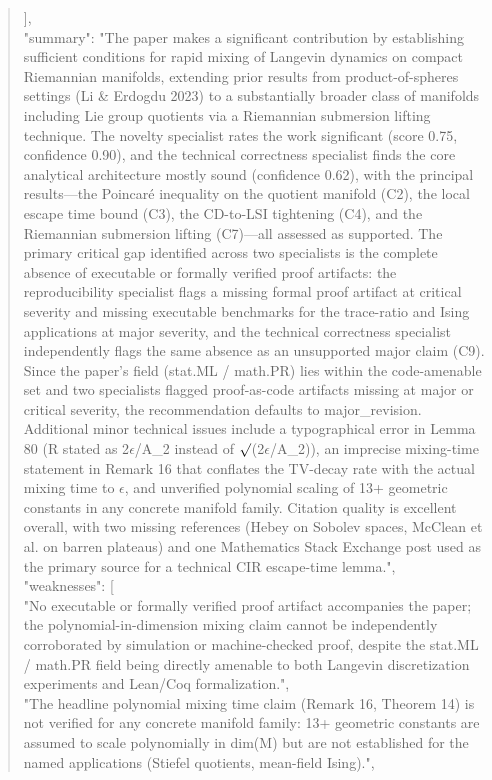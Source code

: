 \documentclass[11pt]{article}
\begin{document}
\begin{quote}
  ],\\
  "summary": "The paper makes a significant contribution by establishing sufficient conditions for rapid mixing of Langevin dynamics on compact Riemannian manifolds, extending prior results from product-of-spheres settings (Li \& Erdogdu 2023) to a substantially broader class of manifolds including Lie group quotients via a Riemannian submersion lifting technique. The novelty specialist rates the work significant (score 0.75, confidence 0.90), and the technical correctness specialist finds the core analytical architecture mostly sound (confidence 0.62), with the principal results---the Poincaré inequality on the quotient manifold (C2), the local escape time bound (C3), the CD-to-LSI tightening (C4), and the Riemannian submersion lifting (C7)---all assessed as supported. The primary critical gap identified across two specialists is the complete absence of executable or formally verified proof artifacts: the reproducibility specialist flags a missing formal proof artifact at critical severity and missing executable benchmarks for the trace-ratio and Ising applications at major severity, and the technical correctness specialist independently flags the same absence as an unsupported major claim (C9). Since the paper's field (stat.ML / math.PR) lies within the code-amenable set and two specialists flagged proof-as-code artifacts missing at major or critical severity, the recommendation defaults to major\_revision. Additional minor technical issues include a typographical error in Lemma 80 (R stated as 2\ensuremath{\epsilon}/A\_2 instead of \ensuremath{\surd}(2\ensuremath{\epsilon}/A\_2)), an imprecise mixing-time statement in Remark 16 that conflates the TV-decay rate with the actual mixing time to \ensuremath{\epsilon}, and unverified polynomial scaling of 13+ geometric constants in any concrete manifold family. Citation quality is excellent overall, with two missing references (Hebey on Sobolev spaces, McClean et al. on barren plateaus) and one Mathematics Stack Exchange post used as the primary source for a technical CIR escape-time lemma.",\\
  "weaknesses": [\\
    "No executable or formally verified proof artifact accompanies the paper; the polynomial-in-dimension mixing claim cannot be independently corroborated by simulation or machine-checked proof, despite the stat.ML / math.PR field being directly amenable to both Langevin discretization experiments and Lean/Coq formalization.",\\
    "The headline polynomial mixing time claim (Remark 16, Theorem 14) is not verified for any concrete manifold family: 13+ geometric constants are assumed to scale polynomially in dim(M) but are not established for the named applications (Stiefel quotients, mean-field Ising).",\\

\end{quote}
\end{document}
